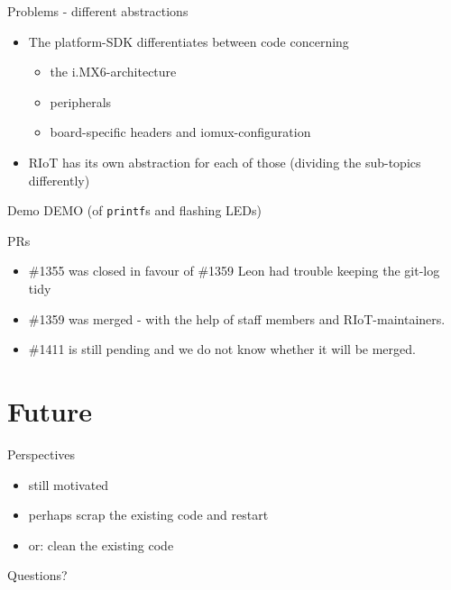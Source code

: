 \documentclass[9pt]{beamer}
\begin{document}
\begin{frame}{Problems - different abstractions}
 \begin{itemize}
 \item The platform-SDK differentiates between code concerning
 	\begin{itemize}
 	\item the i.MX6-architecture
 	\item peripherals
 	\item board-specific headers and iomux-configuration
 	\end{itemize}
 \item RIoT has its own abstraction for each of those (dividing the sub-topics differently)
 \end{itemize}
\end{frame}

\begin{frame}{Demo}
DEMO (of \texttt{printf}s and flashing LEDs)
\end{frame}

\begin{frame}{PRs}
 \begin{itemize}
 \item \#1355 was closed in favour of \#1359 \textcolor{light-gray}{Leon had trouble keeping the git-log tidy}
 \item \#1359 was merged - with the help of staff members and RIoT-maintainers.
 \item \#1411 is still pending and we do not know whether it will be merged.
 \end{itemize}
\end{frame}

\section{Future}

\begin{frame}{Perspectives}
 \begin{itemize}
 \item still motivated
 \item perhaps scrap the existing code and restart
 \item or: clean the existing code
 \end{itemize}
\end{frame}

\begin{frame}{Questions?}

\end{frame}
\end{document}
